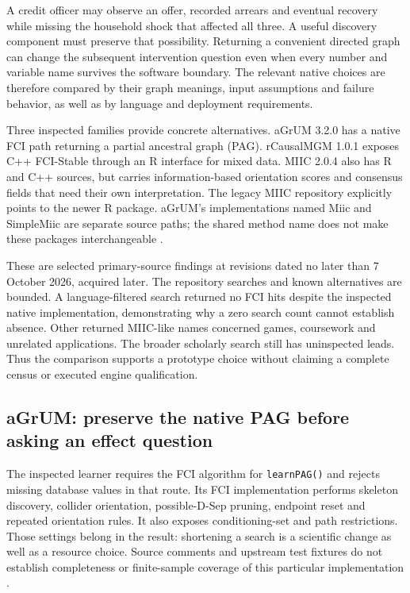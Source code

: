 A credit officer may observe an offer, recorded arrears and eventual recovery
while missing the household shock that affected all three. A useful discovery
component must preserve that possibility. Returning a convenient directed
graph can change the subsequent intervention question even when every number
and variable name survives the software boundary. The relevant native choices
are therefore compared by their graph meanings, input assumptions and failure
behavior, as well as by language and deployment requirements.

Three inspected families provide concrete alternatives. aGrUM 3.2.0 has a
native FCI path returning a partial ancestral graph (PAG). rCausalMGM 1.0.1
exposes C++ FCI-Stable through an R interface for mixed data. MIIC 2.0.4 also
has R and C++ sources, but carries information-based orientation scores and
consensus fields that need their own interpretation. The legacy MIIC repository
explicitly points to the newer R package. aGrUM's implementations named Miic
and SimpleMiic are separate source paths; the shared method name does not make
these packages interchangeable
\citep{exec14_native_agrum,exec14_native_rcmgm,exec14_native_miic}.

These are selected primary-source findings at revisions dated no later than
7 October 2026, acquired later. The repository searches and known alternatives
are bounded. A language-filtered search returned no FCI hits despite the
inspected native implementation, demonstrating why a zero search count cannot
establish absence. Other returned MIIC-like names concerned games, coursework
and unrelated applications. The broader scholarly search still has
uninspected leads. Thus the comparison supports a prototype choice without
claiming a complete census or executed engine qualification.

\subsection{aGrUM: preserve the native PAG before asking an effect question}

The inspected learner requires the FCI algorithm for \texttt{learnPAG()} and
rejects missing database values in that route. Its FCI implementation performs
skeleton discovery, collider orientation, possible-D-Sep pruning, endpoint
reset and repeated orientation rules. It also exposes conditioning-set and
path restrictions. Those settings belong in the result: shortening a search
is a scientific change as well as a resource choice. Source comments and
upstream test fixtures do not establish completeness or finite-sample coverage
of this particular implementation \citep{exec14_native_agrum}.

